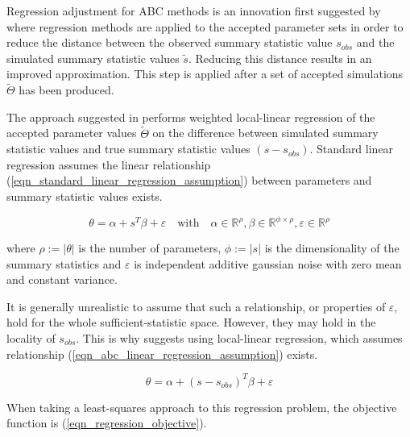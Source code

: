\documentclass[11pt,a4paper]{article}
\theoremstyle{break}
\begin{document}
  \par Regression adjustment for ABC methods is an innovation first suggested by \cite[]{ABC_in_population_genetics} where regression methods are applied to the accepted parameter sets in order to reduce the distance between the observed summary statistic value $s_{obs}$ and the simulated summary statistic values $\tilde{s}$. Reducing this distance results in an improved approximation. This step is applied after a set of accepted simulations $\tilde\Theta$ has been produced.

  \par The approach suggested in \cite[]{ABC_in_population_genetics} performs weighted local-linear regression of the accepted parameter values $\tilde\Theta$ on the difference between simulated summary statistic values and true summary statistic values $(s-s_{obs})$. Standard linear regression assumes the linear relationship (\ref{eqn_standard_linear_regression_assumption}) between parameters and summary statistic values exists.

  \begin{equation}\label{eqn_standard_linear_regression_assumption}
    \theta=\alpha+s^T\beta+\varepsilon\quad\text{with}\quad\alpha\in\mathbb{R}^{\rho},\beta\in\mathbb{R}^{\phi\times\rho},\varepsilon\in\mathbb{R}^\rho
  \end{equation}

  \noindent where $\rho:=|\theta|$ is the number of parameters, $\phi:=|s|$ is the dimensionality of the summary statistics and $\varepsilon$ is independent additive gaussian noise with zero mean and constant variance.

  \par It is generally unrealistic to assume that such a relationship, or properties of $\varepsilon$, hold for the whole sufficient-statistic space. However, they may hold in the locality of $s_{obs}$. This is why \cite[]{ABC_in_population_genetics} suggests using local-linear regression, which assumes relationship (\ref{eqn_abc_linear_regression_assumption}) exists.

  \begin{equation}\label{eqn_abc_linear_regression_assumption}
    \theta=\alpha+(s-s_{obs})^T\beta+\varepsilon
  \end{equation}

  \par When taking a least-squares approach to this regression problem, the objective function is (\ref{eqn_regression_objective}).
\end{document}
